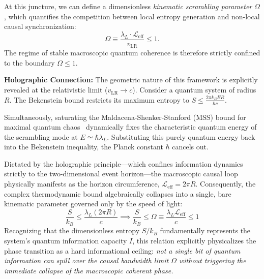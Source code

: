 \documentclass[11pt,a4paper]{article}
\begin{document}
At this juncture, we can define a dimensionless \textit{kinematic scrambling parameter} $\Omega$, which quantifies the competition between local entropy generation and non-local causal synchronization:
\begin{equation}
\Omega \equiv \frac{\lambda_L \cdot \mathcal{L}_{\text{eff}}}{v_{\text{LR}}} \le 1.
\label{eq:omega}
\end{equation}
The regime of stable macroscopic quantum coherence is therefore strictly confined to the boundary $\Omega \le 1$.

\vspace{0.2cm}
\begin{mdframed}[topline=false, rightline=false, bottomline=false, linewidth=2pt, linecolor=gray, innerleftmargin=10pt, rightmargin=15pt, leftmargin=15pt]
\small
\noindent \textbf{\textsf{Holographic Connection:}} The geometric nature of this framework is explicitly revealed at the relativistic limit ($v_{\text{LR}} \to c$). Consider a quantum system of radius $R$. The Bekenstein bound restricts its maximum entropy to $S \le \frac{2\pi k_B E R}{\hbar c}$. 

Simultaneously, saturating the Maldacena-Shenker-Stanford (MSS) bound for maximal quantum chaos~\cite{MSS2016} dynamically fixes the characteristic quantum energy of the scrambling mode at $E \simeq \hbar \lambda_L$. Substituting this purely quantum energy back into the Bekenstein inequality, the Planck constant $\hbar$ cancels out. 

Dictated by the holographic principle—which confines information dynamics strictly to the two-dimensional event horizon—the macroscopic causal loop physically manifests as the horizon circumference, $\mathcal{L}_{\text{eff}} = 2\pi R$. Consequently, the complex thermodynamic bound algebraically collapses into a single, bare kinematic parameter governed only by the speed of light:
$$ \frac{S}{k_B} \le \frac{\lambda_L (2\pi R)}{c} \implies \frac{S}{k_B} \le \Omega \equiv \frac{\lambda_L \mathcal{L}_{\text{eff}}}{c} \le 1$$
Recognizing that the dimensionless entropy $S/k_B$ fundamentally represents the system's quantum information capacity $I$, this relation explicitly physicalizes the phase transition as a hard informational ceiling: \textit{not a single bit of quantum information can spill over the causal bandwidth limit $\Omega$ without triggering the immediate collapse of the macroscopic coherent phase.}
\end{mdframed}
\vspace{0.2cm}
\end{document}
